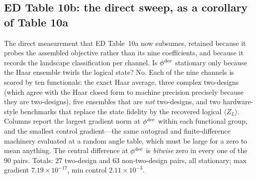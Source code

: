 \documentclass[10pt,a4paper]{article}
\begin{document}
\subsection*{ED Table 10b: the direct sweep, as a corollary of Table 10a}
The direct measurement that ED Table~10a now subsumes, retained because it probes
the assembled objective rather than its nine coefficients, and because it records
the landscape classification per channel. Is $\phi^{\rm dec}$ stationary only
because the Haar ensemble twirls the logical state? No. Each of the nine channels
is scored by ten functionals: the exact Haar
average, three complex two-designs (which agree with the Haar closed form to
machine precision precisely because they are two-designs), five ensembles that
are \emph{not} two-designs, and two hardware-style benchmarks that replace the
state fidelity by the recovered logical $\langle Z_L\rangle$. Columns report the
largest gradient norm at $\phi^{\rm dec}$ within each functional group, and the
smallest control gradient---the same autograd and finite-difference machinery
evaluated at a random angle table, which must be large for a zero to mean
anything. The central difference at $\phi^{\rm dec}$ is \emph{bitwise} zero in
every one of the $90$ pairs. Totals: 27 two-design and 63 non-two-design pairs,
all stationary; max gradient $7.19\times 10^{-17}$, min control $2.11\times 10^{-3}$.
\end{document}
